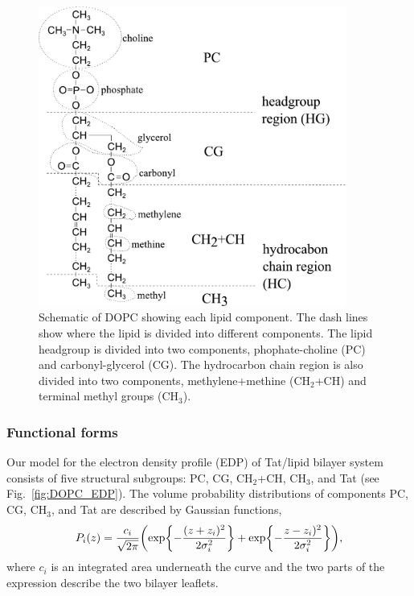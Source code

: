 \begin{figure}[htbp]
  \centering
  \includegraphics[width=0.9\textwidth]{figures/Tat/dopc_schematic.pdf}
  \caption{Schematic of DOPC showing each lipid component. The dash lines 
           show where the lipid is divided into different components. 
           The lipid headgroup
           is divided into two components, phophate-choline (PC) and carbonyl-glycerol (CG). 
           The hydrocarbon chain region is also divided
           into two components, methylene+methine (CH$_2$+CH) and terminal methyl groups (CH$_3$).}
  \label{fig:dopc_schematic}
\end{figure}

\subsubsection{Functional forms}
Our model for the electron density profile (EDP)
of Tat/lipid bilayer system consists of five structural subgroups: PC, CG,
CH$_2$+CH, CH$_3$, and Tat (see Fig.~\ref{fig:DOPC_EDP}).
The volume probability distributions of components PC, CG, CH$_3$, and Tat 
are described by Gaussian functions,
\begin{equation}
  P_i(z)=\frac{c_i}{\sqrt{2\pi}}\mathopen{}\left( 
    \exp\mathopen{}\left\lbrace -\frac{(z+z_i)^2}{2\sigma_i^2} \right\rbrace\mathclose{}
	+ \exp\mathopen{}\left\lbrace -\frac{z-z_i)^2}{2\sigma_i^2} \right\rbrace\mathclose{}
   \right)\mathclose{},
\end{equation}
where $c_i$ is an integrated area underneath the curve and the two parts of the 
expression describe the two bilayer leaflets. 

